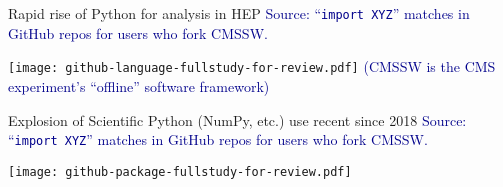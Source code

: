 \begin{frame}{Rapid rise of Python for analysis in HEP}
\vspace{0.25 cm}
\textcolor{darkblue}{Source: ``\texttt{import XYZ}'' matches in GitHub repos for users who fork CMSSW.}

\vspace{0.2 cm}
\texttt{[image: github-language-fullstudy-for-review.pdf]}
\textcolor{darkblue}{\tiny (CMSSW is the CMS experiment's ``offline'' software framework)}
\end{frame}

\begin{frame}{Explosion of Scientific Python (NumPy, etc.) use recent since 2018}
\vspace{0.25 cm}
\textcolor{darkblue}{Source: ``\texttt{import XYZ}'' matches in GitHub repos for users who fork CMSSW.}

\vspace{0.2 cm}
\texttt{[image: github-package-fullstudy-for-review.pdf]}
\end{frame}

